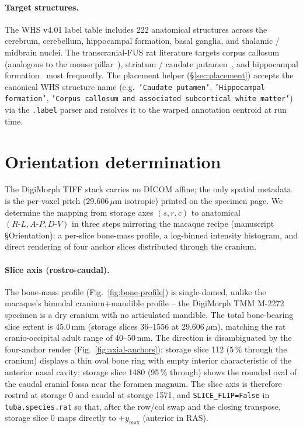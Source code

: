 \documentclass{compactarticle}
\begin{document}
\paragraph{Target structures.}
The WHS v4.01 label table includes 222 anatomical structures across
the cerebrum, cerebellum, hippocampal formation, basal ganglia, and
thalamic / midbrain nuclei. The transcranial-FUS rat literature
targets corpus callosum~\cite{rat-cc-tFUS} (analogous to the mouse
pillar~\cite{tuba-mouse}), striatum / caudate
putamen~\cite{rat-stim-strialum}, and hippocampal
formation~\cite{rat-stim-hpc} most frequently. The placement helper
(\S\ref{sec:placement}) accepts the canonical WHS structure name
(e.g.\ \texttt{'Caudate putamen'}, \texttt{'Hippocampal formation'},
\texttt{'Corpus callosum and associated subcortical white matter'})
via the \texttt{.label} parser and resolves it to the warped
annotation centroid at run time.

\section{Orientation determination}
\label{sec:orientation}

The DigiMorph TIFF stack carries no DICOM affine; the only spatial
metadata is the per-voxel pitch (29.606\,$\mu$m isotropic) printed on
the specimen page. We determine the mapping from storage axes
$(s, r, c)$ to anatomical $(R\text{-}L, A\text{-}P, D\text{-}V)$ in
three steps mirroring the macaque recipe (manuscript~\cite{tuba-macaque}
\S Orientation): a per-slice bone-mass profile, a log-binned intensity
histogram, and direct rendering of four anchor slices distributed
through the cranium.

\paragraph{Slice axis (rostro-caudal).}
The bone-mass profile (Fig.~\ref{fig:bone-profile}) is single-domed,
unlike the macaque's bimodal cranium+mandible profile -- the DigiMorph
TMM M-2272 specimen is a dry cranium with no articulated mandible.
The total bone-bearing slice extent is 45.0\,mm (storage slices
36--1556 at 29.606\,$\mu$m), matching the
rat cranio-occipital adult range of 40--50\,mm. The direction is
disambiguated by the four-anchor render
(Fig.~\ref{fig:axial-anchors}): storage slice 112 (5\,\% through the
cranium) displays a thin oval bone ring with empty interior
characteristic of the anterior nasal cavity; storage slice 1480
(95\,\% through) shows the rounded oval of the caudal cranial fossa
near the foramen magnum. The slice axis is therefore rostral at
storage 0 and caudal at storage 1571, and \texttt{SLICE\_FLIP=False}
in \texttt{tuba.species.rat} so that, after the row/col swap and the
closing transpose, storage slice 0 maps directly to $+y_{\max}$
(anterior in RAS).
\end{document}
